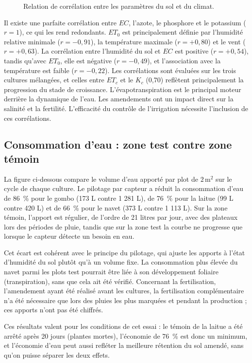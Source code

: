 \begin{figure}[H]
    \centering
    \caption{Relation de corrélation entre les paramètres du sol et du climat. }
    \label{fig:correlation5}
\end{figure}
Il existe une parfaite corrélation entre $EC$, l'azote, le phosphore et le potassium ($r = 1$), ce qui les rend redondants. $ET_0$ est principalement définie par l'humidité relative minimale ($r = -0{,}91$), la température maximale ($r = +0{,}80$) et le vent ($r = +0{,}63$). La corrélation entre l'humidité du sol et $EC$ est positive ($r = +0{,}54$), tandis qu'avec $ET_0$, elle est négative ($r = -0{,}49$), et l'association avec la température est faible ($r = -0{,}22$).
Les corrélations sont évaluées sur les trois cultures mélangées, et celles entre $ET_c$ et le $K_c$ (0,70) reflètent principalement la progression du stade de croissance. L'évapotranspiration est le principal moteur derrière la dynamique de l'eau. Les amendements ont un impact direct sur la salinité et la fertilité. L'efficacité du contrôle de l'irrigation nécessite l'inclusion de ces corrélations.

\subsection{Consommation d’eau : zone test contre zone témoin}

La figure ci-dessous compare le volume d’eau apporté par plot de $2\,\mathrm{m^2}$ sur le cycle de chaque culture. Le pilotage par capteur a réduit la consommation d’eau de 86~\% pour le gombo (173 L contre 1 281 L), de 76~\% pour la laitue (99 L contre 420 L) et de 66~\% pour le navet (373 L contre 1 113 L). Sur la zone témoin, l’apport est régulier, de l’ordre de 21 litres par jour, avec des plateaux lors des périodes de pluie, tandis que sur la zone test la courbe ne progresse que lorsque le capteur détecte un besoin en eau.

Cet écart est cohérent avec le principe du pilotage, qui ajuste les apports à l’état d’humidité du sol plutôt qu’à un volume fixe. La consommation plus élevée du navet parmi les plots test pourrait être liée à son développement foliaire (transpiration), sans que cela ait été vérifié. Concernant la fertilisation, l’amendement ayant été réalisé avant les cultures, la fertilisation complémentaire n’a été nécessaire que lors des pluies les plus marquées et pendant la production ; ces apports n’ont pas été chiffrés.

Ces résultats valent pour les conditions de cet essai : le témoin de la laitue a été arrêté après 20 jours (plantes mortes), l’économie de 76~\% est donc un minimum, et l’économie d’eau peut aussi refléter la meilleure rétention du sol amendé, sans qu’on puisse séparer les deux effets.

